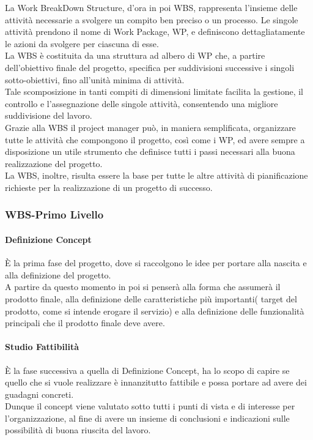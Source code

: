La Work BreakDown Structure, d'ora in poi WBS, rappresenta l'insieme delle attività necessarie a svolgere un compito ben preciso o un processo. Le singole attività prendono il nome di Work Package, WP, e definiscono dettagliatamente le azioni da svolgere per
ciascuna di esse.\\
La WBS è costituita da una struttura ad albero di WP che, a partire dell'obiettivo finale del progetto, specifica per suddivisioni successive i singoli sotto-obiettivi, fino all'unità minima di attività.\\
Tale scomposizione in tanti compiti di dimensioni limitate facilita la gestione, il controllo e l'assegnazione delle singole attività, consentendo una migliore suddivisione del lavoro.\\
Grazie alla WBS il project manager può, in maniera semplificata, organizzare tutte le attività che compongono il progetto, così come i WP, ed avere sempre a disposizione un utile strumento che definisce tutti i passi necessari alla buona realizzazione del progetto.\\
La WBS, inoltre, risulta essere la base per tutte le altre attività di pianificazione richieste per la realizzazione di un progetto di successo.

\subsubsection{WBS-Primo Livello}
\paragraph{Definizione Concept}
È la prima fase del progetto, dove si raccolgono le idee per portare alla nascita e alla definizione del progetto.\\
A partire da questo momento in poi si penserà alla forma che assumerà il prodotto finale, alla  definizione delle caratteristiche più importanti( target del prodotto, come si intende erogare il servizio) e alla definizione delle funzionalità principali che il prodotto finale deve avere.

\paragraph{Studio Fattibilità}
È la fase successiva a quella di Definizione Concept, ha lo scopo di capire se quello che si vuole realizzare è innanzitutto fattibile e possa portare ad avere dei guadagni concreti.\\
Dunque il concept viene valutato sotto tutti i punti di vista e di interesse per l'organizzazione, al fine di avere un insieme di conclusioni e indicazioni sulle possibilità di buona riuscita del lavoro.

